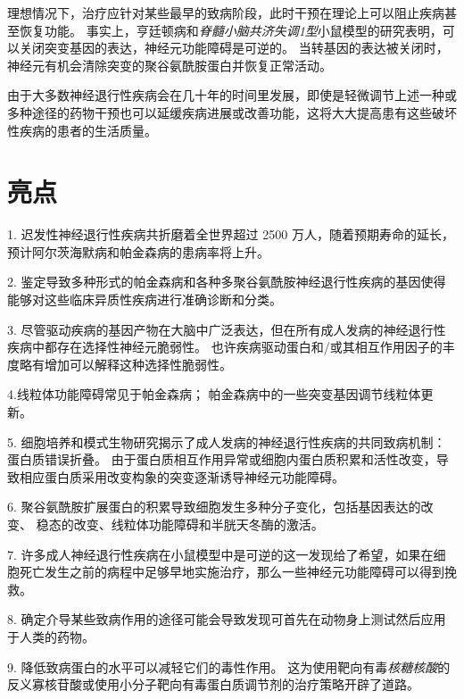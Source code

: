 理想情况下，治疗应针对某些最早的致病阶段，此时干预在理论上可以阻止疾病甚至恢复功能。
事实上，亨廷顿病和\textit{脊髓小脑共济失调1型}小鼠模型的研究表明，可以关闭突变基因的表达，神经元功能障碍是可逆的。
当转基因的表达被关闭时，神经元有机会清除突变的聚谷氨酰胺蛋白并恢复正常活动。


由于大多数神经退行性疾病会在几十年的时间里发展，即使是轻微调节上述一种或多种途径的药物干预也可以延缓疾病进展或改善功能，这将大大提高患有这些破坏性疾病的患者的生活质量。



\section{亮点}

1. 迟发性神经退行性疾病共折磨着全世界超过 2500 万人，随着预期寿命的延长，预计阿尔茨海默病和帕金森病的患病率将上升。 


2. 鉴定导致多种形式的帕金森病和各种多聚谷氨酰胺神经退行性疾病的基因使得能够对这些临床异质性疾病进行准确诊断和分类。


3. 尽管驱动疾病的基因产物在大脑中广泛表达，但在所有成人发病的神经退行性疾病中都存在选择性神经元脆弱性。
也许疾病驱动蛋白和/或其相互作用因子的丰度略有增加可以解释这种选择性脆弱性。


4.线粒体功能障碍常见于帕金森病；
帕金森病中的一些突变基因调节线粒体更新。


5. 细胞培养和模式生物研究揭示了成人发病的神经退行性疾病的共同致病机制：蛋白质错误折叠。
由于蛋白质相互作用异常或细胞内蛋白质积累和活性改变，导致相应蛋白质采用改变构象的突变逐渐诱导神经元功能障碍。


6. 聚谷氨酰胺扩展蛋白的积累导致细胞发生多种分子变化，包括基因表达的改变、 稳态的改变、线粒体功能障碍和半胱天冬酶的激活。


7. 许多成人神经退行性疾病在小鼠模型中是可逆的这一发现给了希望，如果在细胞死亡发生之前的病程中足够早地实施治疗，那么一些神经元功能障碍可以得到挽救。


8. 确定介导某些致病作用的途径可能会导致发现可首先在动物身上测试然后应用于人类的药物。


9. 降低致病蛋白的水平可以减轻它们的毒性作用。
这为使用靶向有毒\textit{核糖核酸}的反义寡核苷酸或使用小分子靶向有毒蛋白质调节剂的治疗策略开辟了道路。

